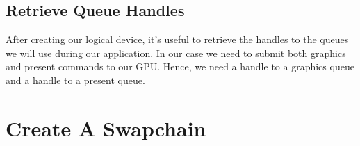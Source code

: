 \subsection{Retrieve Queue Handles}

After creating our logical device, it's useful to retrieve the handles to the
queues we will use during our application.
In our case we need to submit both graphics and present commands to our GPU.
Hence, we need a handle to a graphics queue and a handle to a present queue.

\begin{minipage}{\linewidth}{\noindent}
    
\end{minipage}

\section{Create A Swapchain}
